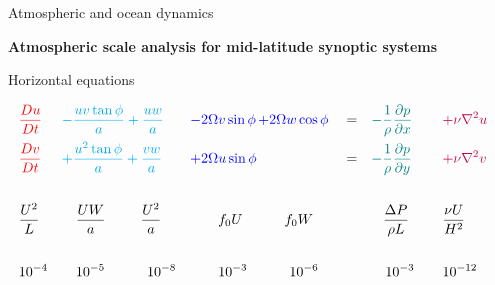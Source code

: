 \documentclass[aspectratio=169,xcolor=dvipsnames]{beamer}
\begin{document}

\begin{frame}[t]{Atmospheric and ocean dynamics}

\vspace{-1.0em}

\begin{center}
\textbf{{\large
Atmospheric scale analysis for mid-latitude synoptic systems
}}
\end{center}

\small 
\center 

\vspace{-0.5em}

Horizontal equations

\begin{align*}
    &\textcolor{red}{    \frac{Du}{Dt}   }&
    &\textcolor{cyan}{   - \frac{uv \tan\phi}{a} + \frac{uw}{a}  }& 
    & \textcolor{blue}{   - 2\Omega v \sin\phi }
     \textcolor{blue}{  \,+ 2\Omega w \cos\phi }&
    & = &
    &\textcolor{teal}{   -\frac{1}{\rho}\frac{\partial p}{\partial x}  }&
    & \textcolor{purple}{\quad + \nu \nabla^2 u }&
    \\
    &\textcolor{red}{    \frac{Dv}{Dt}   } &
    &\textcolor{cyan}{   + \frac{u^2 \tan\phi}{a} + \frac{vw}{a}     }&
    & \textcolor{blue}{   + 2\Omega u \sin\phi    }&
    & = &
    &\textcolor{teal}{   -\frac{1}{\rho}\frac{\partial p}{\partial y}  }&
    & \textcolor{purple}{\quad + \nu \nabla^2 v }&
    \\ \\
      &\textcolor{black}{ \frac{U^2}{L}  }&
      &\textcolor{black}{ \quad \frac{UW}{a} \,\,\,\quad\quad\frac{U^2}{a} }&
      &\textcolor{black}{ \quad\quad f_0 U      }
       \textcolor{black}{\quad\quad\quad f_0 W  }&
      &&
      &\textcolor{black}{ \,\,\,\,\,\frac{\Delta P}{\rho L}  }&
      &\textcolor{black}{ \quad\frac{\nu U}{H^2} }&
    \\ \\
      &\textcolor{black}{ 10^{-4} }&
      &\textcolor{black}{ \quad10^{-5} \quad\quad\quad 10^{-8}  }&
      &\textcolor{black}{ \quad\quad10^{-3}        }
       \textcolor{black}{ \quad\quad\quad 10^{-6} }&
      &&
      &\textcolor{black}{ \quad10^{-3}  }&
      &\textcolor{black}{ \quad10^{-12} }&
\end{align*}

\end{frame}
\end{document}
